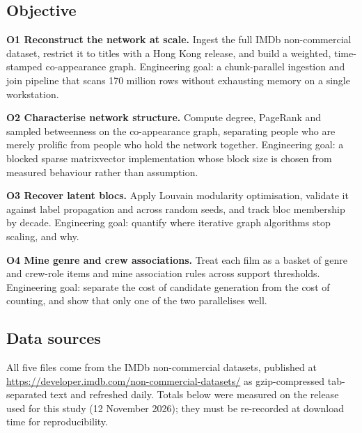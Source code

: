 \subsection{Objective}

\textbf{O1 \textemdash{} Reconstruct the network at scale.} Ingest the full IMDb non-commercial dataset, restrict it to titles with a Hong Kong release, and build a weighted, time-stamped co-appearance graph. Engineering goal: a chunk-parallel ingestion and join pipeline that scans 170 million rows without exhausting memory on a single workstation.

\textbf{O2 \textemdash{} Characterise network structure.} Compute degree, PageRank and sampled betweenness on the co-appearance graph, separating people who are merely prolific from people who hold the network together. Engineering goal: a blocked sparse matrix\textendash{}vector implementation whose block size is chosen from measured behaviour rather than assumption.

\textbf{O3 \textemdash{} Recover latent blocs.} Apply Louvain modularity optimisation, validate it against label propagation and across random seeds, and track bloc membership by decade. Engineering goal: quantify where iterative graph algorithms stop scaling, and why.

\textbf{O4 \textemdash{} Mine genre and crew associations.} Treat each film as a basket of genre and crew-role items and mine association rules across support thresholds. Engineering goal: separate the cost of candidate generation from the cost of counting, and show that only one of the two parallelises well.

\subsection{Data sources}

All five files come from the IMDb non-commercial datasets, published at \url{https://developer.imdb.com/non-commercial-datasets/} as gzip-compressed tab-separated text and refreshed daily. Totals below were measured on the release used for this study (12 November 2026); they must be re-recorded at download time for reproducibility.


